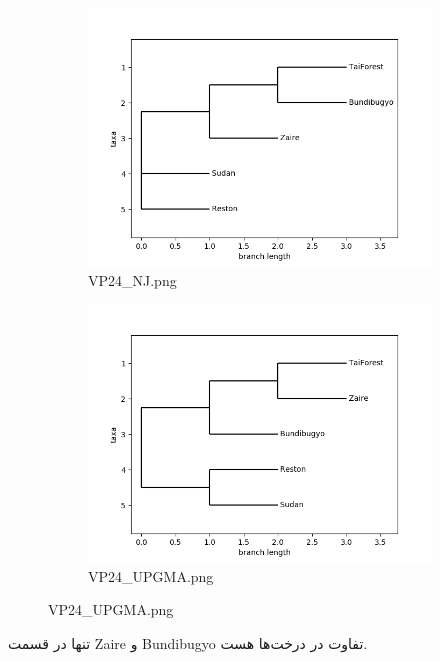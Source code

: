 \documentclass[11pt]{article}
\begin{document}
\begin{figure}[H]
  \centering
  \begin{subfigure}[b]{0.4\linewidth}
    \includegraphics[width=\linewidth]{../Data/Trees/VP24_NJ.png}
    \caption{VP24\_NJ.png}
  \end{subfigure}
  \begin{subfigure}[b]{0.4\linewidth}
    \includegraphics[width=\linewidth]{../Data/Trees/VP24_UPGMA.png}
    \caption{VP24\_UPGMA.png}
  \end{subfigure}
\end{figure}
تنها در قسمت Zaire و Bundibugyo تفاوت در درخت‌‌ها هست.
\end{document}
